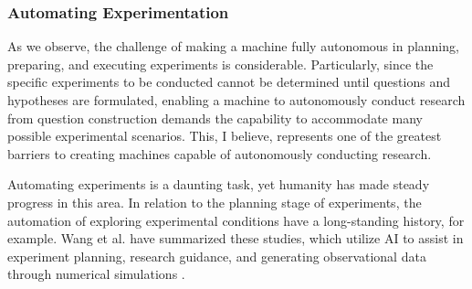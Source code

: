 

\subsubsection{Automating Experimentation}
As we observe, the challenge of making a machine fully autonomous in planning, preparing, and executing experiments is considerable. Particularly, since the specific experiments to be conducted cannot be determined until questions and hypotheses are formulated, enabling a machine to autonomously conduct research from question construction demands the capability to accommodate many possible experimental scenarios. This, I believe, represents one of the greatest barriers to creating machines capable of autonomously conducting research.

Automating experiments is a daunting task, yet humanity has made steady progress in this area. In relation to the planning stage of experiments, the automation of exploring experimental conditions have a long-standing history, for example. Wang et al. have summarized these studies, which utilize AI to assist in experiment planning, research guidance, and generating observational data through numerical simulations \cite{wang2023scientific}.


